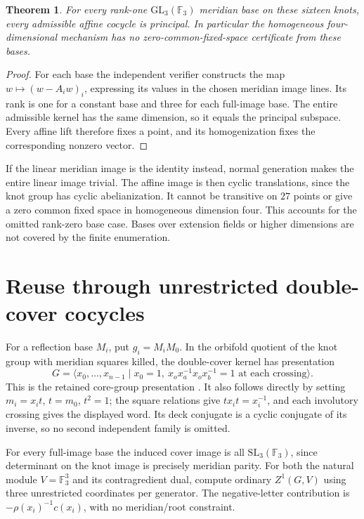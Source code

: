 \documentclass[11pt]{article}
\newtheorem{theorem}[proposition]{Theorem}
\newcommand{\F}{\mathbb F}
\begin{document}
\begin{theorem}
For every rank-one $\mathrm{GL}_3(\F_3)$ meridian base on these
sixteen knots, every admissible affine cocycle is principal.
In particular the homogeneous four-dimensional mechanism has
no zero-common-fixed-space certificate from these bases.
\end{theorem}
\begin{proof}
For each base the independent verifier constructs the map
$w\mapsto(w-A_iw)_i$, expressing its values in the chosen
meridian image lines. Its rank is one for a constant base
and three for each full-image base. The entire admissible
kernel has the same dimension, so it equals the principal
subspace. Every affine lift therefore fixes a point, and
its homogenization fixes the corresponding nonzero vector.
\end{proof}

If the linear meridian image is the identity instead, normal
generation makes the entire linear image trivial. The affine
image is then cyclic translations, since the knot group has
cyclic abelianization. It cannot be transitive on $27$ points
or give a zero common fixed space in homogeneous dimension
four. This accounts for the omitted rank-zero base case.
Bases over extension fields or higher dimensions are not
covered by the finite enumeration.

\section{Reuse through unrestricted double-cover cocycles}

For a reflection base $M_i$, put $g_i=M_iM_0$. In the
orbifold quotient of the knot group with meridian squares
killed, the double-cover kernel has presentation
\[
 G=\langle x_0,\ldots,x_{n-1}\mid x_0=1,
    \ x_ox_a^{-1}x_ox_b^{-1}=1\text{ at each crossing}\rangle.
\]
This is the retained core-group presentation
\cite{core}. It also follows directly by setting
$m_i=x_it$, $t=m_0$, $t^2=1$; the square relations give
$tx_it=x_i^{-1}$, and each involutory crossing gives the
displayed word. Its deck conjugate is a cyclic conjugate
of its inverse, so no second independent family is omitted.

For every full-image base the induced cover image is all
$\mathrm{SL}_3(\F_3)$, since determinant on the knot image
is precisely meridian parity. For both the natural module
$V=\F_3^3$ and its contragredient dual, compute ordinary
$Z^1(G,V)$ using three unrestricted coordinates per
generator. The negative-letter contribution is
$-\rho(x_i)^{-1}c(x_i)$, with no meridian/root constraint.
\end{document}
